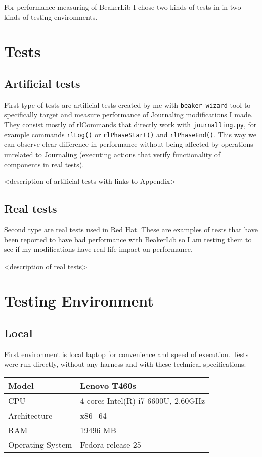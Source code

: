 For performance measuring of BeakerLib I chose two kinds of tests in in two kinds of testing environments.

\section{Tests}

\subsection{Artificial tests}
First type of tests are artificial tests created by me with \texttt{beaker-wizard} tool to specifically target and measure performance of Journaling modifications I made. They consist mostly of rlCommands that directly work with \texttt{journalling.py}, for example commands \texttt{rlLog()} or \texttt{rlPhaseStart()} and \texttt{rlPhaseEnd()}. This way we can observe clear difference in performance without being affected by operations unrelated to Journaling (executing actions that verify functionality of components in real tests). 

<description of artificial tests with links to Appendix>

\subsection{Real tests}
Second type are real tests used in Red Hat. These are examples of tests that have been reported to have bad performance with BeakerLib so I am testing them to see if my modifications have real life impact on performance.

<description of real tests>

\section{Testing Environment}

\subsection{Local}
First environment is local laptop for convenience and speed of execution. Tests were run directly, without any harness and with these technical specifications:  %

\begin{center}
    \begin{tabular}{| l | l |}
    \hline
    Model & Lenovo T460s \\ \hline
    CPU & 4 cores Intel(R) i7-6600U, 2.60GHz \\ \hline
    Architecture & x86\_64 \\ \hline
    RAM & 19496 MB   \\ \hline
    Operating System & Fedora release 25 \\ \hline
    \end{tabular}
\end{center}

